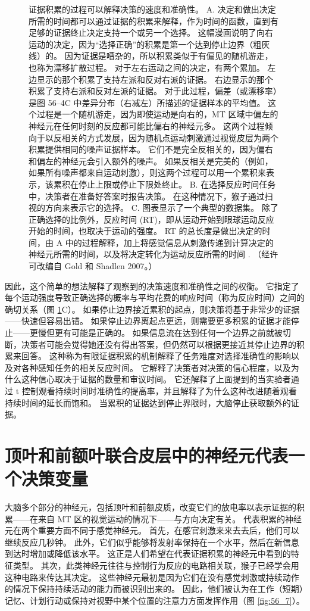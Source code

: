 \begin{figure}[htbp]
	\caption{证据积累的过程可以解释决策的速度和准确性。 A. 决定和做出决定所需的时间都可以通过证据的积累来解释，作为时间的函数，直到有足够的证据终止决定支持一个或另一个选择。 这幅漫画说明了向右运动的决定，因为“选择正确”的积累是第一个达到停止边界（粗灰线）的。 因为证据是嘈杂的，所以积累类似于有偏见的随机游走，也称为漂移扩散过程。 对于左右运动之间的决定，有两个累加。 左边显示的那个积累了支持左派和反对右派的证据。 右边显示的那个积累了支持右派和反对左派的证据。 对于此过程，偏差（或漂移率）是图 56–4C 中差异分布（右减左）所描述的证据样本的平均值。 这个过程是一个随机游走，因为即使运动是向右的，MT 区域中偏左的神经元在任何时刻的反应都可能比偏右的神经元多。 这两个过程倾向于以反相关的方式发展，因为随机点运动刺激通过视觉皮层为两个积累提供相同的噪声证据样本。 它们不是完全反相关的，因为偏右和偏左的神经元会引入额外的噪声。 如果反相关是完美的（例如，如果所有噪声都来自运动刺激），则这两个过程可以用一个累积来表示，该累积在停止上限或停止下限处终止。 B. 在选择反应时间任务中，决策者在准备好答案时报告决策。 在这种情况下，猴子通过扫视的方向来表示它的选择。 C. 图表显示了一个典型的数据集。 除了正确选择的比例外，反应时间 (RT)，即从运动开始到眼球运动反应开始的时间，也取决于运动的强度。 RT 的总长度是做出决定的时间，由 A 中的过程解释，加上将感觉信息从刺激传递到计算决定的神经元所需的时间，以及将决定转化为运动反应所需的时间 . （经许可改编自 Gold 和 Shadlen 2007。）}
	\label{fig:56_6}
\end{figure}

因此，这个简单的想法解释了观察到的决策速度和准确性之间的权衡。 它指定了每个运动强度导致正确选择的概率与平均花费的响应时间（称为反应时间）之间的确切关系（图 \ref{fig:56_6}C）。 如果停止边界接近累积的起点，则决策将基于非常少的证据——快速但容易出错。 如果停止边界离起点更远，则需要更多积累的证据才能停止——更慢但更有可能是正确的。 如果信息流在达到任何一个边界之前就被切断，决策者可能会觉得她还没有得出答案，但仍然可以根据更接近其停止边界的积累来回答。 这种称为有限证据积累的机制解释了任务难度对选择准确性的影响以及对各种感知任务的相关反应时间。 它解释了决策者对决策的信心程度，以及为什么这种信心取决于证据的数量和审议时间。 它还解释了上面提到的当实验者通过 t 控制观看持续时间时准确性的提高率，并且解释了为什么这种改进随着观看持续时间的延长而饱和。 当累积的证据达到停止界限时，大脑停止获取额外的证据。


\section{顶叶和前额叶联合皮层中的神经元代表一个决策变量}
大脑多个部分的神经元，包括顶叶和前额皮质，改变它们的放电率以表示证据的积累——在来自 MT 区的视觉运动的情况下——与方向决定有关。 代表积累的神经元在两个重要方面不同于感觉神经元。 首先，在感官刺激来来去去后，他们可以继续反应几秒钟。 此外，它们似乎能够将发射率保持在一个水平，然后在新信息到达时增加或降低该水平。 这正是人们希望在代表证据积累的神经元中看到的特征类型。 其次，此类神经元往往与控制行为反应的电路相关联，猴子已经学会用这种电路来传达其决定。 这些神经元最初是因为它们在没有感觉刺激或持续动作的情况下保持持续活动的能力而被识别出来的。 因此，他们被认为在工作（短期）记忆、计划行动或保持对视野中某个位置的注意力方面发挥作用（图 \ref{fig:56_7}）。

